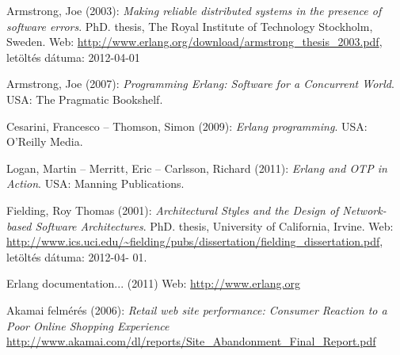 \documentclass[12pt, a4paper, oneside]{book}
\begin{document}
\begin{thebibliography}{9}

Armstrong, Joe (2003): \emph{Making reliable distributed systems in the presence of software errors}. PhD.
thesis, The Royal Institute of Technology Stockholm, Sweden. Web:
\url{http://www.erlang.org/download/armstrong_thesis_2003.pdf}, letöltés dátuma: 2012-04-01

Armstrong, Joe (2007): \emph{Programming Erlang: Software for a Concurrent World}. USA: The Pragmatic
Bookshelf.

Cesarini, Francesco – Thomson, Simon (2009): \emph{Erlang programming}. USA: O'Reilly Media.

Logan, Martin – Merritt, Eric – Carlsson, Richard (2011): \emph{Erlang and OTP in Action}. USA:
Manning Publications.

Fielding, Roy Thomas (2001): \emph{Architectural Styles and the Design of Network-based Software
Architectures}. PhD. thesis, University of California, Irvine. Web:
\url{http://www.ics.uci.edu/~fielding/pubs/dissertation/fielding_dissertation.pdf}, letöltés dátuma: 2012-04-
01.

Erlang documentation... (2011) Web: \url{http://www.erlang.org}

Akamai felmérés (2006): \emph{Retail web site performance: Consumer Reaction to a Poor Online
Shopping Experience}
\url{http://www.akamai.com/dl/reports/Site_Abandonment_Final_Report.pdf}

\end{thebibliography}

\clearpage
{}
\printindex
\end{document}
